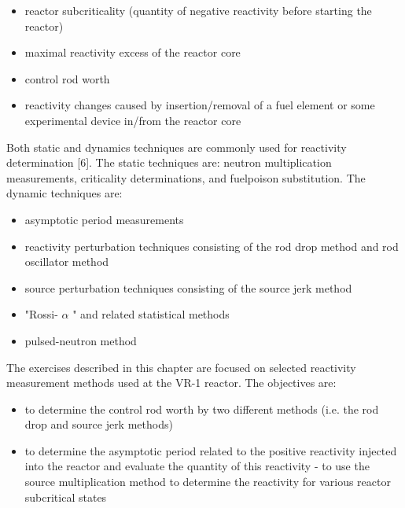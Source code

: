\documentclass[10pt]{article}
\begin{document}
\begin{itemize}
  \item reactor subcriticality (quantity of negative reactivity before starting the reactor)

  \item maximal reactivity excess of the reactor core

  \item control rod worth

  \item reactivity changes caused by insertion/removal of a fuel element or some experimental device in/from the reactor core

\end{itemize}

Both static and dynamics techniques are commonly used for reactivity determination [6]. The static techniques are: neutron multiplication measurements, criticality determinations, and fuelpoison substitution. The dynamic techniques are:

\begin{itemize}
  \item asymptotic period measurements

  \item reactivity perturbation techniques consisting of the rod drop method and rod oscillator method

  \item source perturbation techniques consisting of the source jerk method

  \item "Rossi- $\alpha$ " and related statistical methods

  \item pulsed-neutron method

\end{itemize}

The exercises described in this chapter are focused on selected reactivity measurement methods used at the VR-1 reactor. The objectives are:

\begin{itemize}
  \item to determine the control rod worth by two different methods (i.e. the rod drop and source jerk methods)

  \item to determine the asymptotic period related to the positive reactivity injected into the reactor and evaluate the quantity of this reactivity - to use the source multiplication method to determine the reactivity for various reactor subcritical states

\end{itemize}
\end{document}
